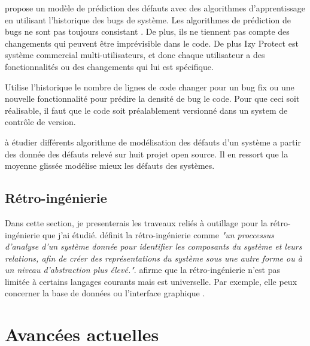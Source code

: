 \documentclass[a4paper]{article}
\begin{document}
\cite{kim07,Bibi06} propose  un modèle de prédiction des défauts avec des algorithmes d'apprentissage en utilisant l'historique des bugs de système. 
Les algorithmes de prédiction de bugs ne sont pas toujours consistant \cite{bang19}. De plus, ils ne tiennent pas compte des changements qui peuvent être imprévisible dans le code. De plus Izy Protect est système commercial multi-utilisateurs, et donc chaque utilisateur a des fonctionnalités ou des changements qui lui est spécifique. 

\cite{naga05} Utilise l'historique le nombre de lignes de code changer pour un bug fix ou une nouvelle fonctionnalité pour prédire la densité de bug  le code. Pour que ceci soit réalisable, il faut que le code soit préalablement versionné dans un system de contrôle de version.

\cite{Raja09} à étudier différents algorithme de modélisation des défauts d'un système a partir des donnée des défauts relevé sur huit projet open source. Il en ressort que la moyenne glissée modélise mieux les défauts des systèmes.

 
\subsection{Rétro-ingénierie}
\label{sec:retroingenierie}
Dans cette section, je presenterais  les traveaux reliés à outillage pour la rétro-ingénierie que j'ai étudié.
\cite{Chik90a} définit la rétro-ingénierie comme \textit{"un proccessus 
 d'analyse d'un système donnée pour identifier les composants du système et leurs relations,
afin de créer des représentations du système sous une autre forme ou à un niveau d'abstraction plus élevé."}.
\cite{Brun14c} afirme que la rétro-ingénierie  n'est pas limitée à certains langages courants 
 mais est universelle. Par exemple, elle peux concerner  la base de données \citep{Delp20a} ou  l'interface graphique \citep{Verh19a}.


\section{Avancées actuelles}
\end{document}
